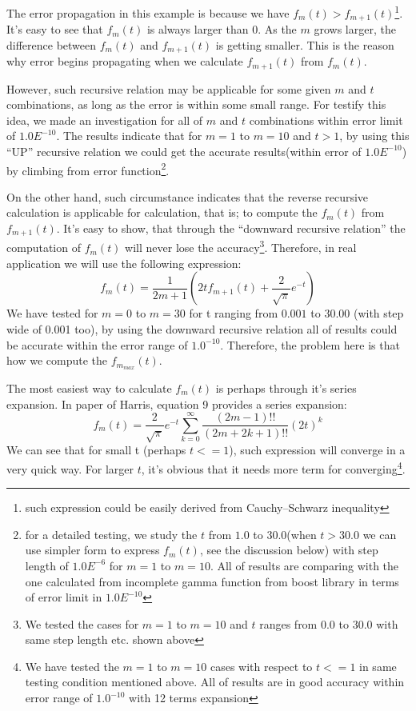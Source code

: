 The error propagation in this example is because we have 
$f_{m}(t) > f_{m+1}(t)$\footnote{such expression could be easily derived from 
Cauchy–Schwarz inequality}. It's easy to see that $f_{m}(t)$ is always larger than 0.
As the $m$ grows larger, the difference between $f_{m}(t)$ and $f_{m+1}(t)$ is getting 
smaller. This is the reason why error begins propagating when we calculate $f_{m+1}(t)$
from $f_{m}(t)$.

However, such recursive relation may be applicable for some given $m$ and $t$ combinations,
as long as the error is within some small range. For testify this idea, we made an
investigation for all of $m$ and $t$ combinations within error limit of $1.0E^{-10}$. 
The results indicate that for $m=1$ to $m=10$ and $t>1$, by using this ``UP'' 
recursive relation we could get the accurate results(within error of $1.0E^{-10}$) 
by climbing from error function\footnote{for a detailed testing, we study the $t$
from $1.0$ to $30.0$(when $t>30.0$ we can use simpler form to express $f_{m}(t)$, see
the discussion below) with step length of $1.0E^{-6}$ for $m=1$ to $m=10$. All of results
are comparing with the one calculated from incomplete gamma function from boost library
in terms of error limit in $1.0E^{-10}$}.

On the other hand, such circumstance indicates that the reverse recursive calculation
is applicable for calculation, that is; to compute the $f_{m}(t)$ from $f_{m+1}(t)$. 
It's easy to show, that through the ``downward recursive relation'' the computation
of $f_{m}(t)$ will never lose the accuracy\footnote{We tested the cases for $m=1$ 
to $m=10$ and $t$ ranges from $0.0$ to $30.0$ with same step length etc. shown above}. 
Therefore, in real application we will use the following expression:
\begin{equation}
 \label{fm_ssssm_fmt_eq:4}
 f_{m}(t) = \frac{1}{2m+1}\left( 2tf_{m+1}(t) + \frac{2}{\sqrt{\pi}}e^{-t}\right) 
\end{equation}
We have tested for $m=0$ to $m=30$ for t ranging from $0.001$ to $30.00$ (with 
step wide of 0.001 too), by using 
the downward recursive relation all of results could be accurate within the error 
range of $1.0^{-10}$. Therefore, the problem here is that how we compute the 
$f_{m_{max}}(t)$.

The most easiest way to calculate $f_{m}(t)$ is perhaps through it's series expansion. In 
paper of Harris\cite{harris1983sssm}, equation 9 provides a series expansion:
\begin{equation}
 \label{fm_ssssm_fmt_eq:5}
 f_{m}(t) = \frac{2}{\sqrt{\pi}}e^{-t}\sum_{k=0}^{\infty}\frac{(2m-1)!!}{(2m+2k+1)!!}
 (2t)^{k}
\end{equation}
We can see that for small t (perhaps $t<=1$), such expression will converge in 
a very quick way. For larger $t$, it's obvious that it needs more term for 
converging\footnote{We have tested the $m=1$ to $m=10$ cases with respect to 
$t<=1$ in same testing condition mentioned above. All of results are in good
accuracy within error range of $1.0^{-10}$ with 12 terms expansion}.

